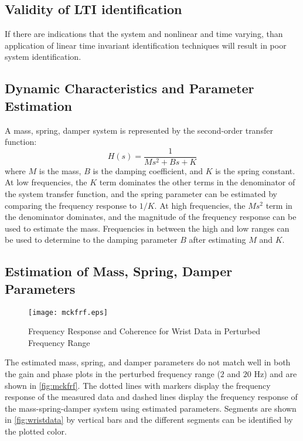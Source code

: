\documentclass[11pt,a4paper]{article}
\begin{document}
\subsection{Validity of LTI identification}
If there are indications that the system and nonlinear and time varying, than
application of linear time invariant identification techniques will result in
poor system identification.

\subsection{Dynamic Characteristics and Parameter Estimation}
A mass, spring, damper system is represented by the second-order transfer
function:
\begin{equation*}
    H(s) = \frac{1}{Ms^2 + Bs + K}
\end{equation*}
where $M$ is the mass, $B$ is the damping coefficient, and $K$ is the spring
constant. At low frequencies, the $K$ term dominates the other terms in the
denominator of the system transfer function, and the spring parameter can be
estimated by comparing the frequency response to $1/K$. At high frequencies,
the $Ms^2$ term in the denominator dominates, and the magnitude of the
frequency response can be used to estimate the mass. Frequencies in between the
high and low ranges can be used to determine to the damping parameter $B$ after
estimating $M$ and $K$.

\subsection{Estimation of Mass, Spring, Damper Parameters}
\begin{figure}
    \centering
    \texttt{[image: mckfrf.eps]}
    \caption{Frequency Response and Coherence for Wrist Data in Perturbed
        Frequency Range}
    \label{fig:mckfrf}
\end{figure}
The estimated mass, spring, and damper parameters do not match well in both the
gain and phase plots in the perturbed frequency range ($2$ and $20$ Hz) and are
shown in \autoref{fig:mckfrf}. The dotted lines with markers display the
frequency response of the measured data and dashed lines display the frequency
response of the mass-spring-damper system using estimated parameters. Segments
are shown in \autoref{fig:wristdata} by vertical bars and the different
segments can be identified by the plotted color.

\end{document}
